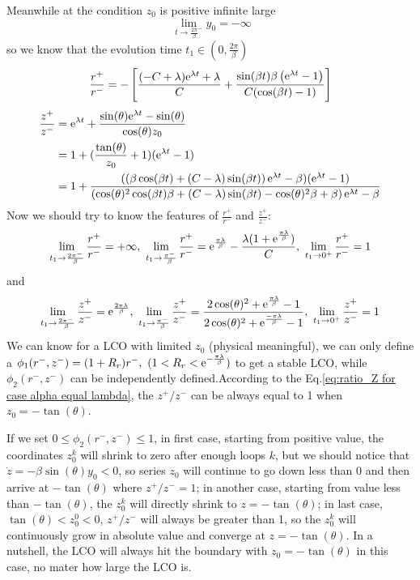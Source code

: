 \documentclass[a4paper,10pt]{article}
\begin{document}
\begin{enumerate}
	Meanwhile at the condition $z_0$ is positive infinite large
	$$
	 ~ \lim_{t \rightarrow \frac{2 \pi}{\beta}^-} y_0= -\infty
	$$
	so we know that the evolution time $t_1 \in (0,\frac{2 \pi}{\beta})$
	\begin{equation}
		\frac{r^+}{r^-}=-\left[
		\frac{(-C+\lambda) {\rm e}^{\lambda t}+\lambda}{C}+\frac{\sin(\beta t) \beta \left({\rm e}^{\lambda t}-1\right)}{C (\cos(\beta t)-1)}
		\right]
		\label{eq:ratio_r for case alpha equal lambda}
	\end{equation}
		\begin{align}
		\nonumber
		\frac{z^+}{z^-} &={\rm e}^{\lambda t}+\frac{\sin(\theta) {\rm e}^{\lambda t}-\sin(\theta)}{\cos(\theta) {z_0}}
		\\ \nonumber
		&= 1+(\frac{\tan(\theta)}{z_0}+1) ({\rm e}^{\lambda t}-1)\\
		&=1+\frac{(\left(\beta \cos(\beta t)+\left(C-\lambda\right) \sin(\beta t)\right) {\rm e}^{\lambda t}-\beta) ({\rm e}^{\lambda t}-1)}
		{\left(\cos(\theta)^{2} \cos(\beta t) \beta+\left(C-\lambda\right) \sin(\beta t)-\cos(\theta)^{2} \beta+\beta\right) {\rm e}^{\lambda t}-\beta}
 		\label{eq:ratio_Z for case alpha equal lambda}
		\end{align}
	Now we should try to know the features of $\frac{r^+}{r^-}$ and $\frac{z^+}{z^-}$:
		$$\lim_{t_1\rightarrow \frac{2 \pi^-}{\beta}} \frac{r^+}{r^-} = +\infty,~\lim_{t_1\rightarrow \frac{\pi^-}{\beta}} \frac{r^+}{r^-} = {\rm e}^{\frac{\pi \lambda}{\beta}}-\frac{\lambda(1+{\rm e}^{\frac{\pi \lambda}{\beta}})} {C} ,~\lim_{t_1\rightarrow 0^+} \frac{r^+}{r^-} = 1$$
		 and 
		 $$\lim_{t_1\rightarrow \frac{2 \pi^-}{\beta}} \frac{z^+}{z^-} = {\rm e}^{\frac{2 \pi \lambda}{\beta}},
		 ~\lim_{t_1\rightarrow \frac{ \pi^-}{\beta}} \frac{z^+}{z^-} = \frac{2 \cos(\theta)^{2}+{\rm e}^{\frac{\pi \lambda}{\beta}}-1}{2 \cos(\theta)^{2}+{\rm e}^{\frac{-\pi \lambda}{\beta}}-1},
		 ~\lim_{t_1\rightarrow 0^+} \frac{z^+}{z^-} = 1$$
		 We can know for a LCO with limited $z_0$ (physical meaningful), we can only define a $\phi_1(r^-,z^-) = (1+R_r) r^-,~(1<R_r< {\rm e}^{-\frac{\pi \lambda}{\beta}})$ to get a stable LCO, while $\phi_2(r^-,z^-)$ can be independently defined.According to the Eq.\ref{eq:ratio_Z for case alpha equal lambda}, the $z^+/z^-$ can be always equal to 1 when $z_0 = -\tan(\theta)$. 
		 
		 If we set $0\leq \phi_2(r^-,z^-) \leq 1$, in first case, starting from positive value, the coordinates $z_0^k$ will shrink to zero after enough loops $k$, but we should notice that $\dot{z}= -\beta \sin(\theta) y_0<0$, so series $z_0$ will continue to go down less than 0 and then arrive at $-\tan(\theta)$ where $z^+/z^-=1$; in another case, starting from value less than $-\tan(\theta)$, the $z_0^k$ will directly shrink to $z=-\tan(\theta)$; in last case, $\tan(\theta)<z_0^0<0$, $z^+/z^-$ will always be greater than 1, so the  $z_0^k$ will continuously grow in absolute value and converge at $z=-\tan(\theta)$. In a nutshell, the LCO will always hit the boundary with $z_0 = -\tan(\theta)$ in this case, no mater how large the LCO is.
		 

\end{enumerate}
\end{document}
